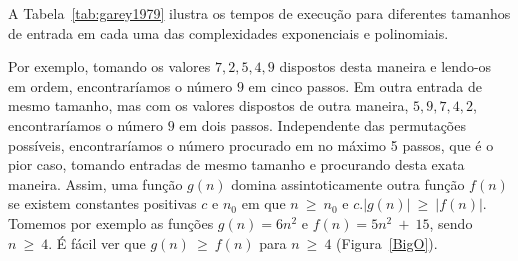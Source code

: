 \documentclass[11pt,fleqn]{book} %
\begin{document}
A Tabela~\ref{tab:garey1979} ilustra os tempos de execução para diferentes tamanhos de entrada em cada uma das complexidades exponenciais e polinomiais.
\begin{table}[htbp]
\centering
\caption{Comparação de tempos de execução polinomiais e exponenciais assumindo que 0,000001s é o tempo gasto para um $n = 1$. Adaptado de ~\textcite{garey1979}.}
\label{tab:garey1979}
\end{table}


Por exemplo, tomando os valores $7, 2, 5, 4, 9$ dispostos desta maneira e lendo-os em ordem, encontraríamos o número $9$ em cinco passos.
Em outra entrada de mesmo tamanho, mas com os valores dispostos de outra maneira, $5, 9, 7, 4, 2$, encontraríamos o número $9$ em dois passos.
Independente das permutações possíveis, encontraríamos o número procurado em no máximo 5 passos, que é o pior caso, tomando entradas de mesmo tamanho e procurando desta exata maneira.
Assim, uma função $g(n)$ domina assintoticamente outra função $f(n)$ se existem constantes positivas $c$ e $n_0$ em que $n~\geq~n_0$ e $c.|g(n)|~\geq~|f(n)|$.
Tomemos por exemplo as funções $g(n)=6n^2$ e $f(n) = 5n^2~+~15$, sendo $n~\geq~4$. 
É fácil ver que $g(n)~\geq~f(n)$ para $n~\geq~4$ (Figura~\ref{BigO}).\\
\end{document}
